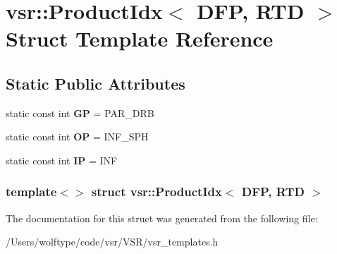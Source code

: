 \hypertarget{structvsr_1_1_product_idx_3_01_d_f_p_00_01_r_t_d_01_4}{\section{vsr\-:\-:Product\-Idx$<$ D\-F\-P, R\-T\-D $>$ Struct Template Reference}
\label{structvsr_1_1_product_idx_3_01_d_f_p_00_01_r_t_d_01_4}
}
\subsection*{Static Public Attributes}
\begin{DoxyCompactItemize}
\item 
\hypertarget{structvsr_1_1_product_idx_3_01_d_f_p_00_01_r_t_d_01_4_a1a11e9d6562127109748b15658521a09}{static const int {\bfseries G\-P} = P\-A\-R\-\_\-\-D\-R\-B}\label{structvsr_1_1_product_idx_3_01_d_f_p_00_01_r_t_d_01_4_a1a11e9d6562127109748b15658521a09}

\item 
\hypertarget{structvsr_1_1_product_idx_3_01_d_f_p_00_01_r_t_d_01_4_ac3b77d6b5733ae9b05829a6c7fd53f53}{static const int {\bfseries O\-P} = I\-N\-F\-\_\-\-S\-P\-H}\label{structvsr_1_1_product_idx_3_01_d_f_p_00_01_r_t_d_01_4_ac3b77d6b5733ae9b05829a6c7fd53f53}

\item 
\hypertarget{structvsr_1_1_product_idx_3_01_d_f_p_00_01_r_t_d_01_4_ad4a632f147b2c8140b891e9555b63d5d}{static const int {\bfseries I\-P} = I\-N\-F}\label{structvsr_1_1_product_idx_3_01_d_f_p_00_01_r_t_d_01_4_ad4a632f147b2c8140b891e9555b63d5d}

\end{DoxyCompactItemize}
\subsubsection*{template$<$$>$ struct vsr\-::\-Product\-Idx$<$ D\-F\-P, R\-T\-D $>$}



The documentation for this struct was generated from the following file\-:\begin{DoxyCompactItemize}
\item 
/\-Users/wolftype/code/vsr/\-V\-S\-R/vsr\-\_\-templates.\-h\end{DoxyCompactItemize}
